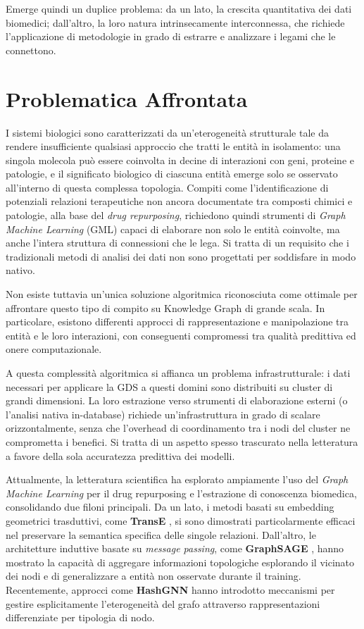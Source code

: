 Emerge quindi un duplice problema: da un lato, la crescita quantitativa dei dati biomedici; dall'altro, la loro natura intrinsecamente interconnessa, che richiede l'applicazione di metodologie in grado di estrarre e analizzare i legami che le connettono.

\section{Problematica Affrontata}
I sistemi biologici sono caratterizzati da un'eterogeneità strutturale tale da rendere insufficiente qualsiasi approccio che tratti le entità in isolamento: una singola molecola può essere coinvolta in decine di interazioni con geni, proteine e patologie, e il significato biologico di ciascuna entità emerge solo se osservato all'interno di questa complessa topologia. Compiti come l'identificazione di potenziali relazioni terapeutiche non ancora documentate tra composti chimici e patologie, alla base del \textit{drug repurposing}, richiedono quindi strumenti di \textit{Graph Machine Learning} (GML) capaci di elaborare non solo le entità coinvolte, ma anche l'intera struttura di connessioni che le lega. Si tratta di un requisito che i tradizionali metodi di analisi dei dati non sono progettati per soddisfare in modo nativo.

Non esiste tuttavia un'unica soluzione algoritmica riconosciuta come ottimale per affrontare questo tipo di compito su Knowledge Graph di grande scala. In particolare, esistono differenti approcci di rappresentazione e manipolazione tra entità e le loro interazioni, con conseguenti compromessi tra qualità predittiva ed onere computazionale.

A questa complessità algoritmica si affianca un problema infrastrutturale: i dati necessari per applicare la GDS a questi domini sono distribuiti su cluster di grandi dimensioni. La loro estrazione verso strumenti di elaborazione esterni (o l'analisi nativa in-database) richiede un'infrastruttura in grado di scalare orizzontalmente, senza che l'overhead di coordinamento tra i nodi del cluster ne comprometta i benefici. Si tratta di un aspetto spesso trascurato nella letteratura a favore della sola accuratezza predittiva dei modelli.

Attualmente, la letteratura scientifica ha esplorato ampiamente l'uso del \textit{Graph Machine Learning} per il drug repurposing e l'estrazione di conoscenza biomedica, consolidando due filoni principali. Da un lato, i metodi basati su embedding geometrici trasduttivi, come \textbf{TransE} \cite{bordes2013translating}, si sono dimostrati particolarmente efficaci nel preservare la semantica specifica delle singole relazioni. Dall'altro, le architetture induttive basate su \textit{message passing}, come \textbf{GraphSAGE} \cite{hamilton2017inductive}, hanno mostrato la capacità di aggregare informazioni topologiche esplorando il vicinato dei nodi e di generalizzare a entità non osservate durante il training.
Recentemente, approcci come \textbf{HashGNN} \cite{neo4j_hashgnn} hanno introdotto meccanismi per gestire esplicitamente l'eterogeneità del grafo attraverso rappresentazioni differenziate per tipologia di nodo.

